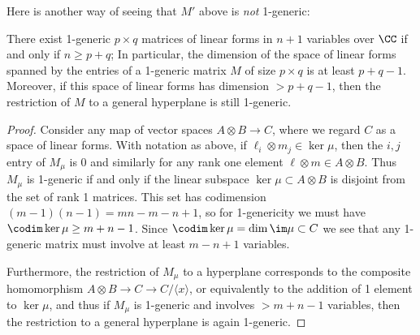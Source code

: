 Here is another way of seeing that $M'$ above is \emph{not} 1-generic:
\begin{lemma}
  \label{size of 1-generic} There exist 1-generic $p\times q$ matrices of linear forms in $n+1$ variables over $\CC$ if and only if $n\geq p+q$;
In particular, the dimension of the space of linear forms spanned by the entries of a  1-generic matrix $M$ of size $p\times q$ is at least $p+q-1$. Moreover, if this space of linear forms has dimension $>p+q-1$, then the restriction of $M$ to a general hyperplane is still 1-generic.
\end{lemma}
\begin{proof} Consider any map of vector spaces $A\otimes B \to C$, where we regard $C$ as a 
space of linear forms.
With notation as above, if $\ell_i\otimes m_j\in \ker \mu$, then the $i,j$ entry of $M_\mu$ is 0 and similarly for
any rank one element $\ell\otimes m\in A\otimes B$. Thus $M_\mu$ is 1-generic if and only if the linear subspace
$\ker \mu \subset  A\otimes B$
is disjoint from the set of rank 1 matrices. This set has codimension $(m-1)(n-1) = mn-m-n+1$,
so for 1-genericity we must have $\codim \ker \mu \geq m+n-1$. Since $\codim \ker \mu = \dim \im \mu\subset C$ we see that any 1-generic matrix must involve at least $m-n+1$ variables. 

Furthermore, the restriction of $M_\mu$ to a hyperplane corresponds to the composite homomorphism
$A\otimes B \to C \to C/\langle x \rangle$, or equivalently to the addition of 1 element to $\ker \mu$, and thus
if $M_\mu$ is 1-generic and involves $>m+n-1$ variables, then the restriction to a general hyperplane
is again 1-generic.
\end{proof}

%

